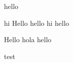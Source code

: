 \documentclass{article}
\providecommand{\myvar}{}
\newcommand{\setvar}[1]{
	\renewcommand{\myvar}{#1}
}
\begin{document}
        hello
	\setvar{hi }
	\myvar
	Hello hello \myvar hello

	\setvar{hola }
	Hello \myvar hello
	\setvar{A}{test}
\end{document}
